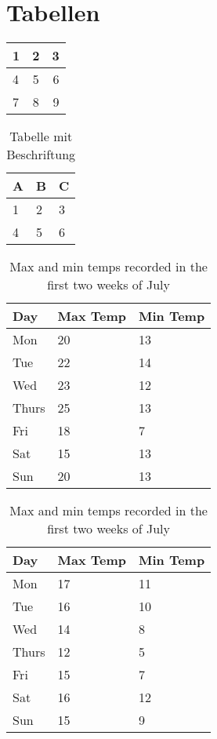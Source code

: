 \section{Tabellen}
\begin{center}
  \begin{tabular}{ | l || c ||| r }
    \hline
    1 & 2 & 3 \\ \hline
    4 & 5 & 6 \\ \hline \hline
    7 & 8 & 9 \\
    \hline
  \end{tabular}
\end{center}

\begin{table}[ht]
\centering
\begin{tabular}{l | l | l}
A & B & C \\
\hline
1 & 2 & 3 \\
4 & 5 & 6
\end{tabular}
\caption{Tabelle mit Beschriftung}
\label{tab:abc}
\end{table}

\begin{table}[ht]
    \begin{subtable}[ht]{0.45\textwidth}
        \centering
        \begin{tabular}{l | l | l}
        Day & Max Temp & Min Temp \\
        \hline \hline
        Mon & 20 & 13\\
        Tue & 22 & 14\\
        Wed & 23 & 12\\
        Thurs & 25 & 13\\
        Fri & 18 & 7\\
        Sat & 15 & 13\\
        Sun & 20 & 13
        \end{tabular}
        \caption{First Week}
        \label{tab:week1}
    \end{subtable}
    \hfill
    \begin{subtable}[ht]{0.45\textwidth}
        \centering
        \begin{tabular}{l | l | l}
        Day & Max Temp & Min Temp \\
        \hline \hline
        Mon & 17 & 11\\
        Tue & 16 & 10\\
        Wed & 14 & 8\\
        Thurs & 12 & 5\\
        Fri & 15 & 7\\
        Sat & 16 & 12\\
        Sun & 15 & 9
        \end{tabular}
        \caption{Second Week}
        \label{tab:week2}
    \end{subtable}
    \caption{Max and min temps recorded in the first two weeks of July}
    \label{tab:temps}
\end{table}

